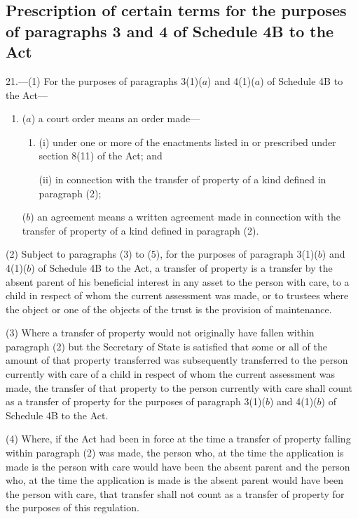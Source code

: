 \documentclass[a4paper]{article}
\newcommand{\parthead}{}
\begin{document}
\renewcommand\parthead{--- Part IV}

\subsection[21. Prescription of certain terms for the
purposes of paragraphs 3 and 4 of Schedule 4B to the Act]{Prescription of certain terms for the
purposes of paragraphs 3 and 4 of Schedule 4B to the Act}

21.—(1) For the purposes
of paragraphs 3(1)($a$) and 4(1)($a$) of Schedule 4B to the Act—
\begin{enumerate}\item[]
($a$) a court order means an order made—
\begin{enumerate}\item[]
(i) under one or more of the enactments listed in or prescribed under section
8(11) of the Act; and

(ii) in connection with the transfer of property of a kind defined in paragraph
(2);
\end{enumerate}

($b$) an agreement means a written agreement made in connection with the transfer
of property of a kind defined in paragraph (2).
\end{enumerate}

(2) Subject to paragraphs (3) to (5), for the purposes of paragraph 3(1)($b$) and
4(1)($b$) of Schedule 4B to the Act, a transfer of property is a transfer by the
absent parent of his beneficial interest in any asset to the person with care,
to a child in respect of whom the current assessment was made, or to trustees
where the object or one of the objects of the trust is the provision of
maintenance.

(3) Where a transfer of property would not originally have fallen within
paragraph (2) but the Secretary of State is satisfied that some or all of the
amount of that property transferred was subsequently transferred to the person
currently with care of a child in respect of whom the current assessment was
made, the transfer of that property to the person currently with care shall
count as a transfer of property for the purposes of paragraph 3(1)($b$) and
4(1)($b$) of Schedule 4B to the Act.

(4) Where, if the Act had been in force at the time a transfer of property
falling within paragraph (2) was made, the person who, at the time the
application is made is the person with care would have been the absent parent
and the person who, at the time the application is made is the absent parent
would have been the person with care, that transfer shall not count as a
transfer of property for the purposes of this regulation.
\end{document}
